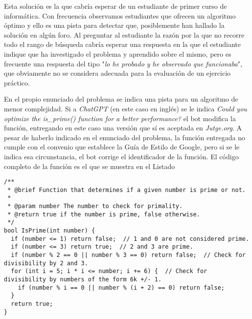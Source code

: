 \documentclass[twocolumn,twoside,a4paper, 10pt]{article}
\newcommand{\ChatGPT}{\textit{ChatGPT}{}}           %
\begin{document}
Esta solución es la que cabría esperar de un estudiante de primer curso de informática.
Con frecuencia observamos estudiantes que ofrecen un algoritmo óptimo y ello es una pista para detectar que,
posiblemente han hallado la solución en algún foro. 
Al preguntar al estudiante la razón por la que no recorre todo el rango de búsqueda cabría esperar una
respuesta en la que el estudiante indique que ha investigado el problema y aprendido sobre el mismo, pero es
frecuente una respuesta del tipo "\textit{lo he probado y he observado que funcionaba}", que obviamente no se
considera adecuada para la evaluación de un ejercicio práctico.

En el propio enunciado del problema se indica una pista para un algoritmo de menor complejidad.
Si a \ChatGPT{} (en este caso en inglés) se le indica
\textit{Could you optimize the is\_prime() function for a better performance?}
el bot modifica la función, entregando en este caso una versión que sí es aceptada en \textit{Jutge.org}.
A pesar de haberlo indicado en el enunciado del problema, la función entregada no cumple con el convenio que
establece la Guía de Estilo de Google, pero si se le indica esa circunstancia, el bot corrige el identificador
de la función. 
El código completo de la función es el que se muestra en el Listado
\begin{figure*}[t]
\begin{lstlisting}[caption={Test de primalidad suministrado por \ChatGPT{}. Complejidad $O(\sqrt(n))$},label=code:prime]
/**
 * @brief Function that determines if a given number is prime or not.
 *
 * @param number The number to check for primality.
 * @return true if the number is prime, false otherwise.
 */
bool IsPrime(int number) {
  if (number <= 1) return false;  // 1 and 0 are not considered prime.
  if (number <= 3) return true;  // 2 and 3 are prime.
  if (number % 2 == 0 || number % 3 == 0) return false;  // Check for divisibility by 2 and 3.
  for (int i = 5; i * i <= number; i += 6) {  // Check for divisibility by numbers of the form 6k +/- 1.
    if (number % i == 0 || number % (i + 2) == 0) return false;
  }
  return true;
}
\end{lstlisting}
\end{figure*}
\end{document}
